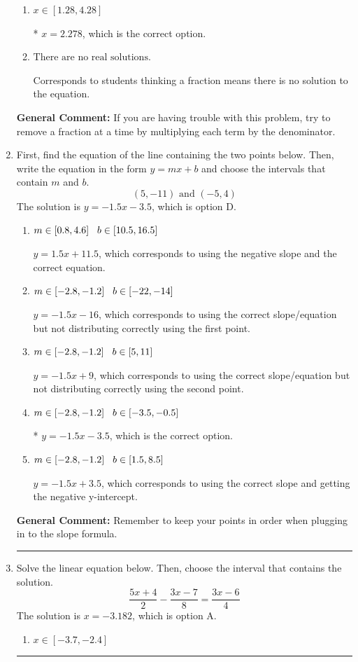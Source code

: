 \documentclass{extbook}[14pt]
\newcommand{\litem}[1]{\item #1

\rule{\textwidth}{0.4pt}}
\begin{document}
\begin{enumerate}
{\begin{enumerate}[label=\Alph*.]
 $x = 0.722$, which corresponds to not distributing the negative in front of the second fraction.
\item \( x \in [1.28, 4.28] \)

* $x = 2.278$, which is the correct option.
\item \( \text{There are no real solutions.} \)

Corresponds to students thinking a fraction means there is no solution to the equation.
\end{enumerate}

\textbf{General Comment:} If you are having trouble with this problem, try to remove a fraction at a time by multiplying each term by the denominator.
}
\litem{
First, find the equation of the line containing the two points below. Then, write the equation in the form $ y=mx+b $ and choose the intervals that contain $m$ and $b$.
\[ (5, -11) \text{ and } (-5, 4) \]The solution is \( y = -1.5x -3.5 \), which is option D.\begin{enumerate}[label=\Alph*.]
\item \( m \in [0.8, 4.6] \hspace*{3mm} b \in [10.5, 16.5] \)

 $y = 1.5x + 11.5$, which corresponds to using the negative slope and the correct equation.
\item \( m \in [-2.8, -1.2] \hspace*{3mm} b \in [-22, -14] \)

 $y = -1.5x -16$, which corresponds to using the correct slope/equation but not distributing correctly using the first point.
\item \( m \in [-2.8, -1.2] \hspace*{3mm} b \in [5, 11] \)

 $y = -1.5x + 9$, which corresponds to using the correct slope/equation but not distributing correctly using the second point.
\item \( m \in [-2.8, -1.2] \hspace*{3mm} b \in [-3.5, -0.5] \)

* $y = -1.5x -3.5$, which is the correct option.
\item \( m \in [-2.8, -1.2] \hspace*{3mm} b \in [1.5, 8.5] \)

 $y = -1.5x + 3.5$, which corresponds to using the correct slope and getting the negative y-intercept.
\end{enumerate}

\textbf{General Comment:} Remember to keep your points in order when plugging in to the slope formula.
}
\litem{
Solve the linear equation below. Then, choose the interval that contains the solution.
\[ \frac{5x + 4}{2} - \frac{3x -7}{8} = \frac{3x -6}{4} \]The solution is \( x = -3.182 \), which is option A.\begin{enumerate}[label=\Alph*.]
\item \( x \in [-3.7, -2.4] \)


\end{enumerate}}
\end{enumerate}
\end{document}
